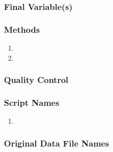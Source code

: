 \subsubsection*{Final Variable(s)}

\subsubsection*{Methods}

\begin{enumerate}
\item 
\item
\end{enumerate}

\subsubsection*{Quality Control}

\subsubsection*{Script Names}

\begin{enumerate}
\item 
\end{enumerate}

\subsubsection*{Original Data File Names}

